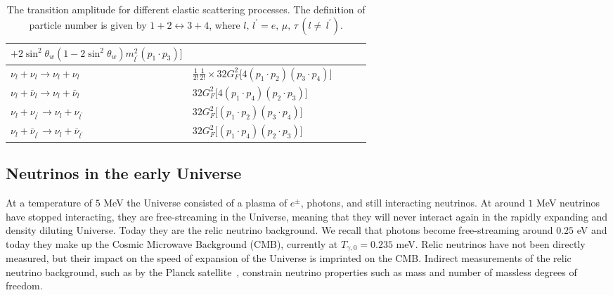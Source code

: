 \begin{table}[ht]
\begin{tabular}{lp{8cm}lp{8cm}l}
   $+2\sin^2\theta_w\left(1-2\sin^2\theta_w\right)m^2_{l^\prime}\left(p_1\cdot p_3\right)\bigg]$ \\
\hline
$\nu_l+\nu_l\longrightarrow\nu_l+\nu_l$ &
$\frac{1}{2!}\frac{1}{2!}\times32G^2_F\bigg[4\left(p_1\cdot p_2\right)\left(p_3\cdot p_4\right)\bigg]$ \\
\hline
$\nu_l+\bar{\nu}_l\longrightarrow\nu_l+\bar{\nu}_l$ &
$32G^2_F\bigg[4\left(p_1\cdot p_4\right)\left(p_2\cdot p_3\right)\bigg]$ \\
\hline
$\nu_l+\nu_{l^\prime}\longrightarrow\nu_l+\nu_{l^\prime}$ &
$32G^2_F\bigg[\left(p_1\cdot p_2\right)\left(p_3\cdot p_4\right)\bigg]$ \\
\hline
$\nu_l+\bar{\nu}_{l^\prime}\longrightarrow\nu_l+\bar{\nu}_{l^\prime}$ &
$32G^2_F\bigg[\left(p_1\cdot p_4\right)\left(p_2\cdot p_3\right)\bigg]$ \\
\hline\hline
\end{tabular}
\caption{The transition amplitude for different elastic scattering processes. The definition of particle number is given by $1+2\leftrightarrow3+4$, where $l,\,l^\prime=e,\,\mu,\,\tau\,(l\neq\,l^\prime)$.}
\label{T006}
\end{table}

\clearpage


\subsection{Neutrinos in the early Universe }

At a temperature of $5$ MeV the Universe consisted of a plasma of $e^\pm$, photons, and still interacting neutrinos. At around $1$ MeV neutrinos have stopped interacting, they are free-streaming in the Universe, meaning that they will never interact again in the rapidly expanding and density diluting Universe.  Today they are the relic neutrino background. We recall that photons become free-streaming around $0.25$ eV and today they make up the Cosmic Microwave Background (CMB), currently at $T_{\gamma,0}=0.235$ meV. Relic neutrinos have not been directly measured, but their impact on the speed of expansion of the Universe is imprinted on the CMB. Indirect measurements of the relic neutrino background, such as by the Planck satellite~\cite{Planck:2018vyg,Planck:2015fie,Planck:2013pxb}, constrain neutrino properties such as mass and number of massless degrees of freedom.

